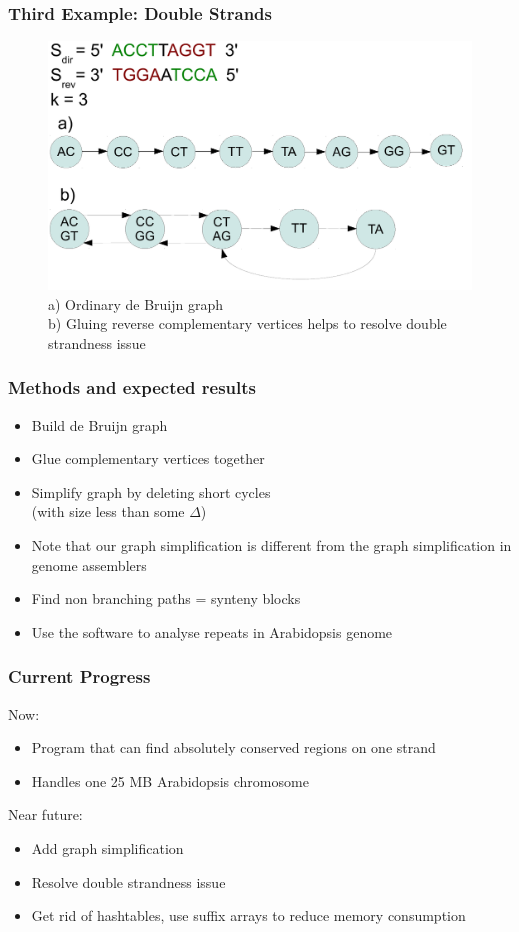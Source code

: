 \documentclass[svgnames,14pt]{beamer}
\begin{document}
\begin{frame}
\frametitle{Third Example: Double Strands}
\begin{figure}
\centering
\includegraphics[scale = 0.50]{Figure5.pdf}
\small \caption{a) Ordinary de Bruijn graph \\ b) Gluing reverse complementary vertices helps to resolve double strandness issue}
\end{figure}
\end{frame}

\begin{frame}
\frametitle{Methods and expected results}
\begin{itemize}
\item Build de Bruijn graph
\item Glue complementary vertices together
\item Simplify graph by deleting short cycles \\ (with size less than some \( \Delta \))
\item Note that our graph simplification is different from the graph simplification in genome assemblers
\item Find non branching paths = synteny blocks
\item Use the software to analyse repeats in Arabidopsis genome
\end{itemize}
\end{frame}

\begin{frame}
\frametitle{Current Progress}
Now:
\begin{itemize}
\item Program that can find absolutely conserved regions on one strand
\item Handles one 25 MB Arabidopsis chromosome
\end{itemize}
Near future:
\begin{itemize}
\item Add graph simplification
\item Resolve double strandness issue
\item Get rid of hashtables, use suffix arrays to reduce memory consumption
\end{itemize}
\end{frame}
\end{document}
